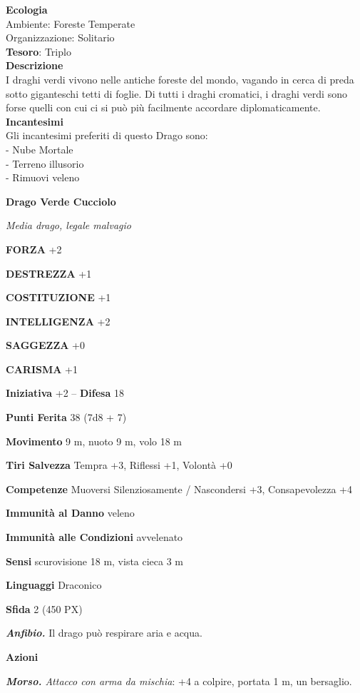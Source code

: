 \begin{multicols}{2}
	\textbf{Ecologia}\\
	Ambiente: Foreste Temperate\\
	Organizzazione: Solitario\\
	\textbf{Tesoro}: Triplo\\
	\textbf{Descrizione}\\
	I draghi verdi vivono nelle antiche foreste del mondo, vagando in cerca di preda sotto giganteschi tetti di foglie. Di tutti i draghi cromatici, i draghi verdi sono forse quelli con cui ci si può più facilmente accordare diplomaticamente.\\
	\textbf{Incantesimi}\\
	Gli incantesimi preferiti di questo Drago sono:\\
	- Nube Mortale\\
	- Terreno illusorio\\
	- Rimuovi veleno

	\medskip{}\textbf{Drago Verde Cucciolo}

	\textit{Media drago, legale malvagio}

	\textbf{FORZA} +2

	\textbf{DESTREZZA} +1

	\textbf{COSTITUZIONE} +1

	\textbf{INTELLIGENZA} +2

	\textbf{SAGGEZZA} +0

	\textbf{CARISMA} +1

	\textbf{Iniziativa} +2 -- \textbf{Difesa} 18

	\textbf{Punti Ferita} 38 (7d8 + 7)

	\textbf{Movimento} 9 m, nuoto 9 m, volo 18 m

	\textbf{Tiri Salvezza} Tempra +3, Riflessi +1, Volontà +0

	\textbf{Competenze} Muoversi Silenziosamente / Nascondersi +3, Consapevolezza +4

	\textbf{Immunità al Danno} veleno

	\textbf{Immunità alle Condizioni} avvelenato

	\textbf{Sensi} scurovisione 18 m, vista cieca 3 m

	\textbf{Linguaggi} Draconico

	\textbf{Sfida} 2 (450 PX)

	\textit{\textbf{Anfibio.}} Il drago può respirare aria e acqua.

	\textbf{Azioni}

	\textit{\textbf{Morso.} Attacco con arma da mischia}: +4 a colpire, portata 1 m, un bersaglio.


\end{multicols}
